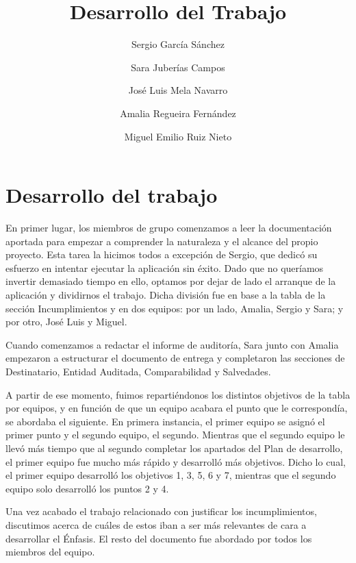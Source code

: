 \documentclass[a4paper,12pt]{report}
\begin{document}
\title{Desarrollo del Trabajo}

\author{
		Sergio García Sánchez
		\and
		Sara Juberías Campos
		\and
		José Luis Mela Navarro
		\and
		Amalia Regueira Fernández
		\and
		Miguel Emilio Ruiz Nieto
	}

\maketitle
\section*{Desarrollo del trabajo}

En primer lugar, los miembros de grupo comenzamos a leer la documentación aportada para empezar a
comprender la naturaleza y el alcance del propio proyecto. Esta tarea la hicimos todos a excepción
de Sergio, que dedicó su esfuerzo en intentar ejecutar la aplicación sin éxito. Dado que no queríamos
invertir demasiado tiempo en ello, optamos por dejar de lado el arranque de la aplicación y dividirnos el
trabajo. Dicha división fue en base a la tabla de la sección Incumplimientos y en dos equipos:
por un lado, Amalia, Sergio y Sara; y por otro, José Luis y Miguel.

Cuando comenzamos a redactar el informe de auditoría, Sara junto con Amalia empezaron a estructurar
el documento de entrega y completaron las secciones de Destinatario, Entidad Auditada, Comparabilidad
y Salvedades.

A partir de ese momento, fuimos repartiéndonos los distintos objetivos de la tabla por equipos,
y en función de que un equipo acabara el punto que le correspondía, se abordaba el siguiente.
En primera instancia, el primer equipo se asignó el primer punto y el segundo equipo, el segundo.
Mientras que el segundo equipo le llevó más tiempo que al segundo completar los apartados del Plan de desarrollo, el primer equipo fue mucho más rápido y desarrolló más objetivos. Dicho lo cual, el primer
equipo desarrolló los objetivos 1, 3, 5, 6 y 7, mientras que el segundo equipo solo desarrolló los puntos
2 y 4.

Una vez acabado el trabajo relacionado con justificar los incumplimientos, discutimos acerca de cuáles
de estos iban a ser más relevantes de cara a desarrollar el Énfasis. El resto del documento fue abordado
por todos los miembros del equipo.
\end{document}
